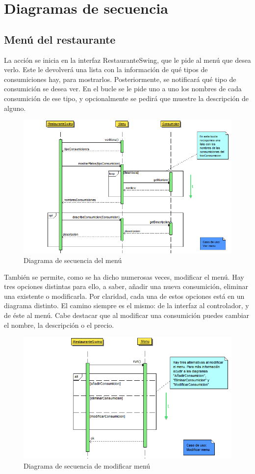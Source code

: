 \documentclass[spanish,a4paper,11pt, twoside]{report}	%
\begin{document}
	\section{Diagramas de secuencia}
		\subsection{Menú del restaurante}
		La acción se inicia en la interfaz RestauranteSwing, que le pide al menú que desea verlo. Este le devolverá una lista con la información de qué tipos de consumiciones hay, para mostrarlos. Posteriormente, se notificará qué tipo de consumición se desea ver. En el bucle se le pide uno a uno los nombres de cada consumición de ese tipo, y opcionalmente se pedirá que muestre la descripción de alguno. 
		\begin{figure}[!h]
		\centering
		\includegraphics[scale=0.6]{DSvermenu.png}
		\caption{Diagrama de secuencia del menú}
		\end{figure}

		También se permite, como se ha dicho numerosas veces, modificar el menú. Hay tres opciones distintas para ello, a saber, añadir una nueva consumición, eliminar una existente o modificarla. Por claridad, cada una de estos opciones está en un diagrama distinto. El camino siempre es el mismo: de la interfaz al controlador, y de éste al menú. Cabe destacar que al modificar una consumición puedes cambiar el nombre, la descripción o el precio.
		\begin{figure}[!h]
		\centering
		\includegraphics[scale=0.6]{DSmodificarmenu.png}
		\caption{Diagrama de secuencia de modificar menú}
		\end{figure}		
\end{document}
